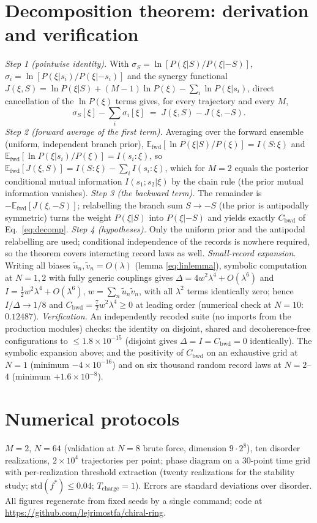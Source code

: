 \documentclass[11pt]{article}
\newcommand{\Cbwd}{C_{\mathrm{bwd}}}
\begin{document}
\section{Decomposition theorem: derivation and verification}\label{app:proofs2}
\textit{Step 1 (pointwise identity).} With $\sigma_S=\ln[P(\xi|S)/P(\xi|{-}S)]$, $\sigma_i=\ln[P(\xi|s_i)/P(\xi|{-}s_i)]$ and the synergy functional $J(\xi,S)=\ln P(\xi|S)+(M{-}1)\ln P(\xi)-\sum_i\ln P(\xi|s_i)$, direct cancellation of the $\ln P(\xi)$ terms gives, for every trajectory and every $M$,
\[
\sigma_S[\xi]-\sum_i\sigma_i[\xi]\;=\;J(\xi,S)-J(\xi,{-}S).
\]
\textit{Step 2 (forward average of the first term).} Averaging over the forward ensemble (uniform, independent branch prior), $\mathbb E_{\mathrm{fwd}}[\ln P(\xi|S)/P(\xi)]=I(S{:}\xi)$ and $\mathbb E_{\mathrm{fwd}}[\ln P(\xi|s_i)/P(\xi)]=I(s_i{:}\xi)$, so $\mathbb E_{\mathrm{fwd}}[J(\xi,S)]=I(S{:}\xi)-\sum_iI(s_i{:}\xi)$, which for $M{=}2$ equals the posterior conditional mutual information $I(s_1;s_2|\xi)$ by the chain rule (the prior mutual information vanishes).
\textit{Step 3 (the backward term).} The remainder is $-\mathbb E_{\mathrm{fwd}}[J(\xi,{-}S)]$; relabelling the branch sum $S\to{-}S$ (the prior is antipodally symmetric) turns the weight $P(\xi|S)$ into $P(\xi|{-}S)$ and yields exactly $\Cbwd$ of Eq.~\eqref{eq:decomp}.
\textit{Step 4 (hypotheses).} Only the uniform prior and the antipodal relabelling are used; conditional independence of the records is nowhere required, so the theorem covers interacting record laws as well.
\textit{Small-record expansion.} Writing all biases $\tilde u_n,\tilde v_n=O(\lambda)$ (lemma \eqref{eq:linlemma}), symbolic computation at $N{=}1,2$ with fully generic couplings gives $\Delta=4w^2\lambda^4+O(\lambda^6)$ and $I=\tfrac12w^2\lambda^4+O(\lambda^6)$, $w=\sum_n\tilde u_n\tilde v_n$, with all $\lambda^2$ terms identically zero; hence $I/\Delta\to1/8$ and $\Cbwd=\tfrac72w^2\lambda^4\ge0$ at leading order (numerical check at $N{=}10$: $0.12487$).
\textit{Verification.} An independently recoded suite (no imports from the production modules) checks: the identity on disjoint, shared and decoherence-free configurations to $\le1.8\times10^{-15}$ (disjoint gives $\Delta=I=\Cbwd=0$ identically). The symbolic expansion above; and the positivity of $\Cbwd$ on an exhaustive grid at $N{=}1$ (minimum $-4\times10^{-16}$) and on six thousand random record laws at $N{=}2$--$4$ (minimum $+1.6\times10^{-8}$).

\section{Numerical protocols}
$M{=}2$, $N{=}64$ (validation at $N{=}8$ brute force, dimension $9\cdot2^8$), ten disorder realizations, $2\times10^4$ trajectories per point; phase diagram on a $30$-point time grid with per-realization threshold extraction (twenty realizations for the stability study; $\mathrm{std}(f^*)\le0.04$; $T_{\mathrm{charge}}=1$). Errors are standard deviations over disorder. All figures regenerate from fixed seeds by a single command; code at \url{https://github.com/lejrimostfa/chiral-ring}.
\end{document}
